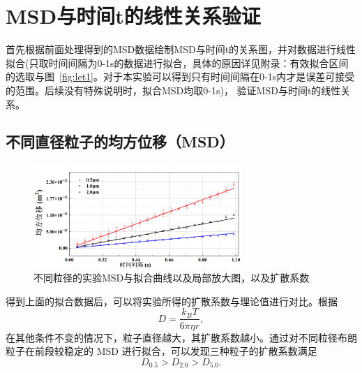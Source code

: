 \documentclass[a4paper]{report} %
\begin{document}
\section{MSD与时间t的线性关系验证}
首先根据前面处理得到的MSD数据绘制MSD与时间t的关系图，并对数据进行线性拟合(只取时间间隔为0-1s的数据进行拟合，具体的原因详见附录：有效拟合区间的选取与图~\ref{fig:let1}。对于本实验可以得到只有时间间隔在0-1s内才是误差可接受的范围。后续没有特殊说明时，拟合MSD均取0-1s)，
验证MSD与时间t的线性关系。 \par
\subsection{不同直径粒子的均方位移（MSD）}
\begin{figure}[H]
  \centering
  \includegraphics[width=0.7\textwidth]{实验数据拟合1.png}
  \caption{不同粒径的实验MSD与拟合曲线以及局部放大图，以及扩散系数}
  \label{fig:fit1}
\end{figure}
得到上面的拟合数据后，可以将实验所得的扩散系数与理论值进行对比。根据
\begin{equation}
    D = \frac{k_B T}{6 \pi \eta r},
\end{equation}
在其他条件不变的情况下，粒子直径越大，其扩散系数越小。通过对不同粒径布朗粒子在前段较稳定的 MSD 进行拟合，可以发现三种粒子的扩散系数满足
\[
    D_{0.5} > D_{2.0} > D_{5.0}.
\]
\end{document}
